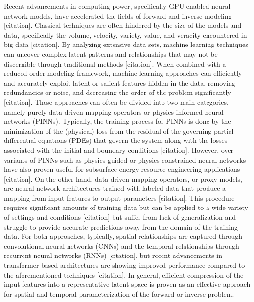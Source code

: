 \documentclass[default,iicol,lineno]{sn-jnl}%
\begin{document}
Recent advancements in computing power, specifically GPU-enabled neural network models, have accelerated the fields of forward and inverse modeling [citation]. Classical techniques are often hindered by the size of the models and data, specifically the volume, velocity, variety, value, and veracity encountered in big data [citation]. By analyzing extensive data sets, machine learning techniques can uncover complex latent patterns and relationships that may not be discernible through traditional methods [citation]. When combined with a reduced-order modeling framework, machine learning approaches can efficiently and accurately exploit latent or salient features hidden in the data, removing redundancies or noise, and decreasing the order of the problem significantly [citation]. These approaches can often be divided into two main categories, namely purely data-driven mapping operators or physics-informed neural networks (PINNs). Typically, the training process for PINNs is done by the minimization of the (physical) loss from the residual of the governing partial differential equations (PDEs) that govern the system along with the losses associated with the initial and boundary conditions [citation]. However, over variants of PINNs such as physics-guided or physics-constrained neural networks have also proven useful for subsurface energy resource engineering applications [citation]. On the other hand, data-driven mapping operators, or proxy models, are neural network architectures trained with labeled data that produce a mapping from input features to output parameters [citation]. This procedure requires significant amounts of training data but can be applied to a wide variety of settings and conditions [citation] but suffer from lack of generalization and struggle to provide accurate predictions away from the domain of the training data. For both approaches, typically, spatial relationships are captured through convolutional neural networks (CNNs) and the temporal relationships through recurrent neural networks (RNNs) [citation], but recent advancements in transformer-based architectures are showing improved performance compared to the aforementioned techniques [citation]. In general, efficient compression of the input features into a representative latent space is proven as an effective approach for spatial and temporal parameterization of the forward or inverse problem.
\end{document}
